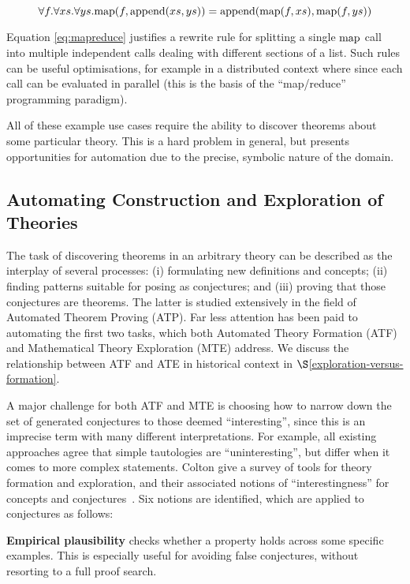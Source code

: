 \begin{equation} \label{eq:mapreduce}
  \forall f. \forall xs. \forall ys.
    \text{map}(f, \text{append}(xs, ys)) = \text{append}(\text{map}(f, xs), \text{map}(f, ys))
\end{equation}

Equation \ref{eq:mapreduce} justifies a rewrite rule for splitting a single
$\text{map}$ call into multiple independent calls dealing with different sections of a
list. Such rules can be useful optimisations, for example in a distributed
context where since each call can be evaluated in parallel (this is the basis of
the ``map/reduce'' programming paradigm).

All of these example use cases require the ability to discover theorems about
some particular theory. This is a hard problem in general, but presents
opportunities for automation due to the precise, symbolic nature of the domain.

\subsection{Automating Construction and Exploration of Theories}
\label{sec:te}

The task of discovering theorems in an arbitrary theory can be
described as the interplay of several processes: (i) formulating new
definitions and concepts; (ii) finding patterns suitable for posing as
conjectures; and (iii) proving that those conjectures are theorems.
The latter is studied extensively in the field of Automated Theorem
Proving (ATP). Far less attention has been paid to automating the
first two tasks, which both Automated Theory Formation (ATF) and
Mathematical Theory Exploration (MTE) address.  We discuss the relationship
between ATF and ATE in historical context in
$\S$\ref{exploration-versus-formation}.

A major challenge for both ATF and MTE is choosing how to narrow down
the set of generated conjectures to those deemed ``interesting'', since this is
an imprecise term with many different interpretations. For example, all existing
approaches agree that simple tautologies are ``uninteresting'', but differ when
it comes to more complex statements.  Colton \etal{} give a survey of tools for
theory formation and exploration, and their associated notions of
``interestingness'' for concepts and conjectures~\cite{colton2000notion}. Six
notions are identified, which are applied to conjectures as follows:

{\bf Empirical plausibility} checks whether a property holds across some
specific examples. This is especially useful for avoiding false conjectures,
without resorting to a full proof search.

